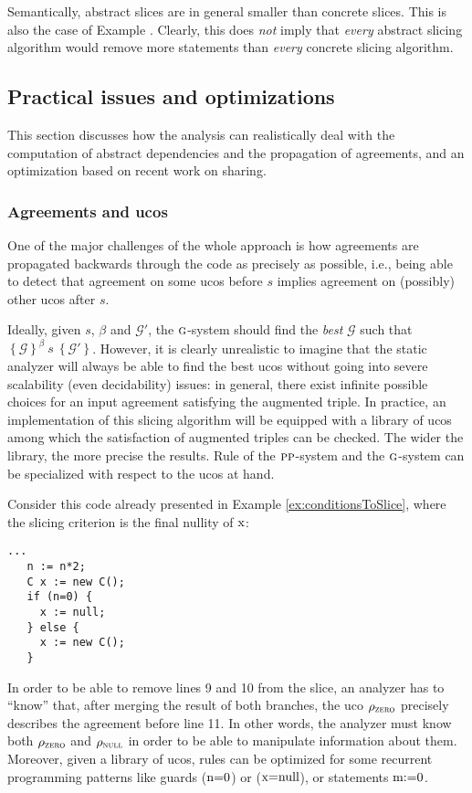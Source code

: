 \documentclass[prodmode,acmtocl]{acmsmall}
\def\uco{\ensuremath{\rho}\xspace}
\newcommand{\0}{\mbox{\bf 0}}
\newcommand{\CODE}[1]{\ensuremath{\mbox{\lstinline!#1!}\xspace}\xspace}
\def\xx{\CODE{x}}
\def\ZERODOM{\ensuremath{\uco_{\textsc{zero}}}\xspace}
\def\NULLDOM{\ensuremath{\uco_{\textsc{null}}}\xspace}
\def\PRED{\beta}
\def\AGREEM{\mathcal{G}}
\newcommand{\RULENAME}[1]{\textsc{#1}}
\newcommand{\PSMTH}[1]{$\RULENAME{pp}$-#1}
\def\PSYSTEM{\PSMTH{system}\xspace}
\newcommand{\GSMTH}[1]{$\RULENAME{g}$-#1}
\def\GSYSTEM{\GSMTH{system}\xspace}
\newcommand{\TRIPLEB}[4]{\left\{#1\right\}^{#2}\ #3\ \left\{#4\right\}}
\begin{document}
Semantically, abstract slices are in general smaller than concrete
slices.  This is also the case of
Example \label{ex:conditionsToSlice1}.  Clearly, this does \emph{not}
imply that \emph{every} abstract slicing algorithm would remove more
statements than \emph{every} concrete slicing algorithm.

\subsection{Practical issues and optimizations}
\label{sec:practicalIssuesAndOptimizations}

This section discusses how the analysis can realistically deal with
the computation of abstract dependencies and the propagation of
agreements, and an optimization based on recent work on sharing.

\subsubsection{Agreements and ucos}
\label{sec:agreementsAndUcos}

One of the major challenges of the whole approach is how agreements
are propagated backwards through the code as precisely as possible,
i.e., being able to detect that agreement on some ucos before $s$
implies agreement on (possibly) other ucos after $s$.

Ideally, given $s$, $\PRED$ and $\AGREEM'$, the \GSYSTEM should find
the \emph{best} $\AGREEM$ such that
$\TRIPLEB{\AGREEM}{\PRED}{s}{\AGREEM'}$.  However, it is clearly
unrealistic to imagine that the static analyzer will always be able to
find the best ucos without going into severe scalability (even
decidability) issues: in general, there exist infinite possible
choices for an input agreement satisfying the augmented triple.  In
practice, an implementation of this slicing algorithm will be equipped
with a library of ucos among which the satisfaction of augmented
triples can be checked.  The wider the library, the more precise the
results.  Rule of the \PSYSTEM and the \GSYSTEM can be specialized
with respect to the ucos at hand.

\begin{example}
  \label{ex:conditionsToSlice2}
  Consider this code already presented in Example
  \ref{ex:conditionsToSlice}, where the slicing criterion is the final
  nullity of \xx:
  {\em \begin{lstlisting}[firstnumber=8]
   ...
   n := n*2;
   C x := new C();
   if (n=0) {
     x := null;
   } else {
     x := new C();
   }
  \end{lstlisting}}
  \noindent
  In order to be able to remove lines 9 and 10 from the slice, an
  analyzer has to ``know'' that, after merging the result of both
  branches, the uco $\ZERODOM$ precisely describes the agreement
  before line 11.  In other words, the analyzer must know both
  $\ZERODOM$ and $\NULLDOM$ in order to be able to manipulate
  information about them.  Moreover, given a library of ucos, rules
  can be optimized for some recurrent programming patterns like guards
  (\CODE{n=0}) or (\CODE{x=null}), or statements \CODE{m:=0}.
\end{example}
\end{document}
